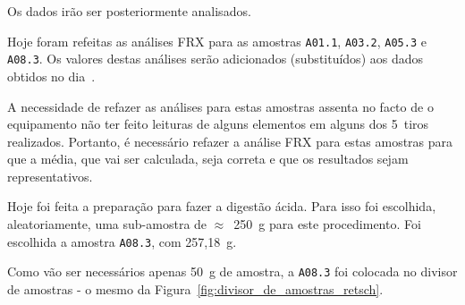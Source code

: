 

Os dados irão ser posteriormente analisados.

\hrulefill



Hoje foram refeitas as análises FRX para as amostras \texttt{A01.1}, \texttt{A03.2}, \texttt{A05.3} e \texttt{A08.3}.
Os valores destas análises serão adicionados (substituídos) aos dados obtidos no dia~.

A necessidade de refazer as análises para estas amostras assenta no facto de o equipamento não ter feito leituras de alguns elementos em alguns dos 5~tiros realizados.
Portanto, é necessário refazer a análise FRX para estas amostras para que a média, que vai ser calculada, seja correta e que os resultados sejam representativos.

\hrulefill


Hoje foi feita a preparação para fazer a digestão ácida.
Para isso foi escolhida, aleatoriamente, uma sub-amostra de $\approx$~250~g para este procedimento.
Foi escolhida a amostra \texttt{A08.3}, com 257,18~g.

Como vão ser necessários apenas 50~g de amostra, a \texttt{A08.3} foi colocada no divisor de amostras - o mesmo da Figura~\ref{fig:divisor_de_amostras_retsch}.

